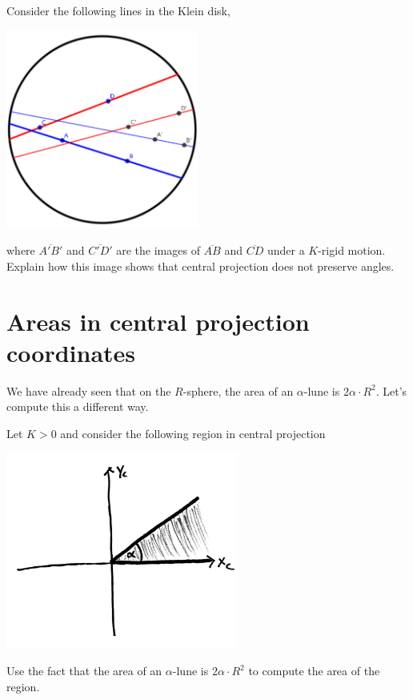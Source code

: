 \documentclass{ximera}
\begin{document}
\begin{problem}
  Consider the following lines in the Klein disk,
  \begin{image}
    \includegraphics[width=2.5in]{kleinDiskNonConformal.png}
  \end{image}
  where $\overline{A'B'}$ and $\overline{C'D'}$ are the images of
  $\overline{AB}$ and $\overline{CD}$ under a $K$-rigid
  motion. Explain how this image shows that central projection does
  not preserve angles.
\end{problem}


\section{Areas in central projection coordinates}



We have already seen that on the $R$-sphere, the area of an
$\alpha$-lune is $2\alpha\cdot R^2$. Let's compute this a different
way.

\begin{problem}
  Let $K>0$ and consider the following region in central projection
 \begin{image}
   \includegraphics[width=3in]{halfLune.png}
 \end{image}
 Use the fact that the area of an $\alpha$-lune is $2\alpha\cdot R^2$
 to compute the area of the region.
\end{problem}
\end{document}
